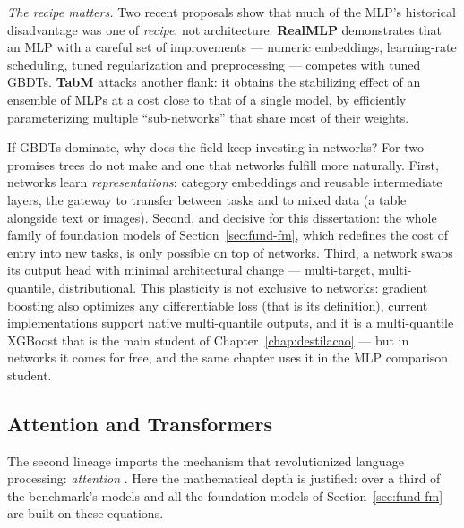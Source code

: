 \emph{The recipe matters.} Two recent proposals show that much of
the MLP's historical disadvantage was one of \emph{recipe}, not
architecture. \textbf{RealMLP} \citep{realmlp2024} demonstrates that
an MLP with a careful set of improvements --- numeric embeddings,
learning-rate scheduling, tuned regularization and preprocessing ---
competes with tuned GBDTs. \textbf{TabM} \citep{tabm2025} attacks
another flank: it obtains the stabilizing effect of an ensemble of
MLPs at a cost close to that of a single model, by efficiently
parameterizing multiple ``sub-networks'' that share most of their
weights.

If GBDTs dominate, why does the field keep investing in networks?
For two promises trees do not make and one that networks fulfill
more naturally. First, networks learn \emph{representations}:
category embeddings and reusable intermediate layers, the gateway to
transfer between tasks and to mixed data (a table alongside text or
images). Second, and decisive for this dissertation: the whole
family of foundation models of Section~\ref{sec:fund-fm}, which
redefines the cost of entry into new tasks, is only possible on top
of networks. Third, a network swaps its output head with minimal
architectural change --- multi-target, multi-quantile,
distributional. This plasticity is not exclusive to networks:
gradient boosting also optimizes any differentiable loss (that is
its definition), current implementations support native
multi-quantile outputs, and it is a multi-quantile XGBoost that is
the main student of Chapter~\ref{chap:destilacao} --- but in
networks it comes for free, and the same chapter uses it in the MLP
comparison student.

\subsection{Attention and Transformers}

The second lineage imports the mechanism that revolutionized
language processing: \emph{attention} \citep{vaswani2017}. Here the
mathematical depth is justified: over a third of the benchmark's
models and all the foundation models of Section~\ref{sec:fund-fm}
are built on these equations.

